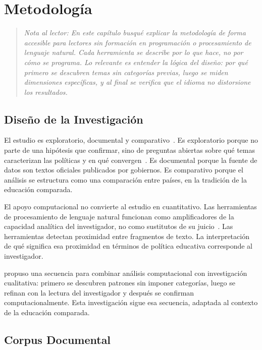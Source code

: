 
\chapter{Metodología}
\label{cap:metodologia}

\begin{quote}\small\textit{
Nota al lector: En este capítulo busqué explicar la metodología de forma accesible para lectores sin formación en programación o procesamiento de lenguaje natural. Cada herramienta se describe por lo que hace, no por cómo se programa. Lo relevante es entender la lógica del diseño: por qué primero se descubren temas sin categorías previas, luego se miden dimensiones específicas, y al final se verifica que el idioma no distorsione los resultados.
}\end{quote}


\section{Diseño de la Investigación}

El estudio es exploratorio, documental y comparativo~\citep{hernandez2014metodologia}. Es exploratorio porque no parte de una hipótesis que confirmar, sino de preguntas abiertas sobre qué temas caracterizan las políticas y en qué convergen~\citep{bowen2009document}. Es documental porque la fuente de datos son textos oficiales publicados por gobiernos. Es comparativo porque el análisis se estructura como una comparación entre países, en la tradición de la educación comparada.

El apoyo computacional no convierte al estudio en cuantitativo. Las herramientas de procesamiento de lenguaje natural funcionan como amplificadores de la capacidad analítica del investigador, no como sustitutos de su juicio~\citep{grimmer2013text}. Las herramientas detectan proximidad entre fragmentos de texto. La interpretación de qué significa esa proximidad en términos de política educativa corresponde al investigador.

\citet{nelson2020computational} propuso una secuencia para combinar análisis computacional con investigación cualitativa: primero se descubren patrones sin imponer categorías, luego se refinan con la lectura del investigador y después se confirman computacionalmente. Esta investigación sigue esa secuencia, adaptada al contexto de la educación comparada.


\section{Corpus Documental}

